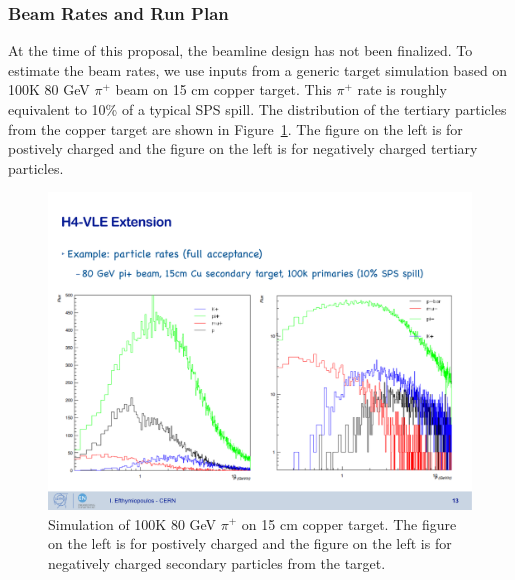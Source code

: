 

\subsubsection{Beam Rates and Run Plan}
At the time of this proposal, the beamline design has not been finalized. To estimate the beam rates, we use inputs from a generic target simulation based on 100K 80 GeV $\pi^+$ beam on 15 cm copper target. This $\pi^+$ rate is roughly equivalent to 10\% of a typical SPS spill. The distribution of the tertiary particles from the copper target are shown in Figure~\ref{fig:PionOnCuTarget}. The figure on the left is for postively charged and the figure on the left is for negatively charged tertiary particles. 

\begin{figure}[h]
  \centering
\includegraphics[scale=0.45]{figures/80GeVPion-15cmCuTarget.pdf}
  \caption{Simulation of 100K 80 GeV $\pi^+$ on 15 cm copper target. The figure on the left is for postively charged and the figure on the left is for negatively charged secondary particles from the target. }
\label{fig:PionOnCuTarget}
\end{figure}

